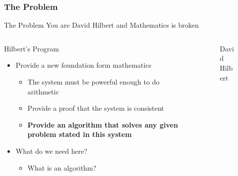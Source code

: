 \documentclass[aspectratio=169,10pt]{beamer}
\begin{document}
\begin{frame}
  \frametitle{The Problem}
  \begin{block}{The Problem}
    You are David Hilbert and Mathematics is broken
  \end{block}
  \pause

  \begin{columns}
    \begin{column}{0.75\textwidth}
      \begin{block}{Hilbert's Program}
        \begin{itemize}
          \item Provide a new foundation form mathematics
                \begin{itemize}
                  \item The system must be powerful enough to do arithmetic
                  \item Provide a proof that the system is consistent
                  \item \textbf{Provide an algorithm that solves any given problem stated in this system}
                \end{itemize}
                \pause
          \item What do we need here?
                \begin{itemize}
                  \item What is an algorithm?
                \end{itemize}
        \end{itemize}
      \end{block}
    \end{column}
    \begin{column}{0.2\textwidth}
      \begin{figure}
        \caption{David Hilbert}
      \end{figure}
    \end{column}
    \pause
  \end{columns}
\end{frame}
\end{document}

